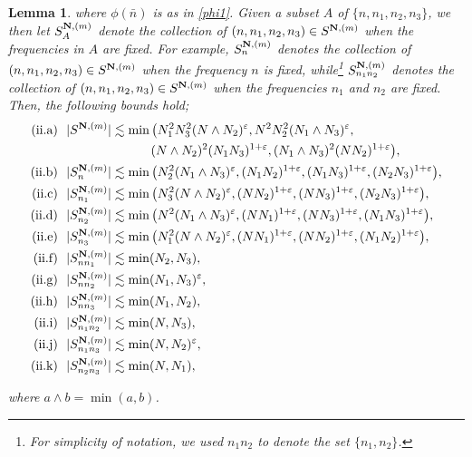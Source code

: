 \documentclass[%
11pt,  reqno]{amsart}
\newtheorem{lemma}[theorem]{Lemma}
\newcommand{\1}{\hspace{0.2mm}\text{I}\hspace{0.2mm}}
\newcommand{\noi}{\noindent}
\newcommand{\eps}{\varepsilon}
\newcommand{\les}{\lesssim}
\numberwithin{equation}{section}
\numberwithin{theorem}{section}
\begin{document}
\begin{lemma}
\noi
where $\phi(\bar n)$ is as in \eqref{phi1}.
Given a subset $A$ of $\{n, n_1, n_2, n_3\}$, 
we then let $S^{{\bf N}, (m)}_A$ denote 
the collection of 
$(n, n_1,n_2,n_3)\in S^{{\bf N}, (m)}$
when the frequencies in $A$ are fixed.
For example, 
$S^{{\bf N}, (m)}_{n}$ denotes 
the collection of 
$(n, n_1,n_2,n_3)\in S^{{\bf N}, (m)}$
when the frequency $n$ is  fixed, 
while\footnote{For simplicity of notation, 
we used $n_1n_2$ to denote the set $\{n_1, n_2\}$.} 
$S^{{\bf N}, (m)}_{n_1n_2}$ denotes 
the collection of 
$(n, n_1,n_2,n_3)\in S^{{\bf N}, (m)}$
when the frequencies $n_1$ and $n_2$ are  fixed.
Then, the following bounds hold\textup{;}
\begin{align*}
\textup{(ii.a)}\ \ & 
|S^{{\bf N}, (m)}|  \les 
\min \big(N_1^2 N_3^2 (N\wedge N_2)^{\eps}, N^2 N_2^2 (N_1\wedge  N_3)^{\eps}, 
\\
& \hphantom{XXXXXXXl}
(N\wedge N_2)^2 (N_1N_3)^{1+\eps}, (N_1\wedge N_3)^2 (NN_2)^{1+\eps} \big), \\
\textup{(ii.b)}\ \ & 
|S_n^{{\bf N}, (m)}|\lesssim  \min \big(N_2^2 (N_1\wedge N_3)^{\eps}, 
(N_1N_2)^{1+\eps}, (N_1 N_3)^{1+\eps}, (N_2 N_3)^{1+\eps}\big), \\
\textup{(ii.c)}\ \ & 
|S^{{\bf N}, (m)}_{n_1}|\lesssim  \min \big(N_3^2 (N\wedge N_2)^{\eps}, (NN_2)^{1+\eps}, 
(N N_3)^{1+\eps}, 
(N_2 N_3)^{1+\eps} \big), \\
\textup{(ii.d)}\ \  &  
|S^{{\bf N}, (m)}_{n_2}|\lesssim  \min \big(N^2 (N_1\wedge N_3)^{\eps},
 (NN_1)^{1+\eps}, (N N_3)^{1+\eps}, 
 (N_1N_3)^{1+\eps}
\big), \\
\textup{(ii.e)}\ \ & 
|S^{{\bf N}, (m)}_{n_3}|\lesssim \min \big( N_1^2 (N\wedge N_2)^{\eps}, 
(N N_1)^{1+\eps}, 
(N N_2)^{1+\eps}, (N_1 N_2)^{1+\eps}\big), \\
\textup{(ii.f)}\ \ & 
|S^{{\bf N}, (m)}_{nn_1}|\lesssim  \min (N_2, N_3),\\
\textup{(ii.g)}\ \ & 
|S^{{\bf N}, (m)}_{nn_2}|\lesssim  \min (N_1, N_3)^{\eps}, \\
\textup{(ii.h)}\  \ & 
|S^{{\bf N}, (m)}_{nn_3}|\lesssim \min (N_1, N_2), \\
\textup{(ii.i)}\  \ & 
|S^{{\bf N}, (m)}_{n_1n_2}|\lesssim  \min(N, N_3), \\
\textup{(ii.j)}\ \ & 
 |S^{{\bf N}, (m)}_{n_1n_3}|\lesssim   \min (N, N_2)^{\eps},\\
 \textup{(ii.k)}\ \ & 
|S^{{\bf N}, (m)}_{n_2n_3}|\lesssim  \min (N, N_1), 
\end{align*}

\noi
where $a \wedge b  = \min (a,b)$. 
 
 
\end{lemma}
\end{document}
